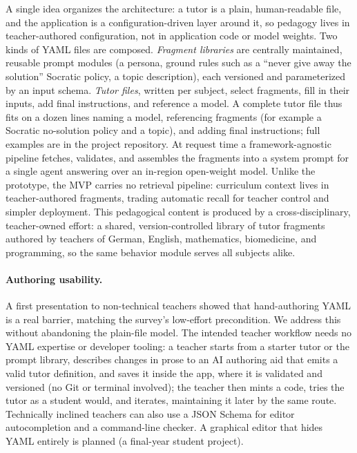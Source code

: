 \documentclass[runningheads]{llncs}
\begin{document}
A single idea organizes the architecture: a tutor is a plain, human-readable file, and the application is a configuration-driven layer around it, so pedagogy lives in teacher-authored configuration, not in application code or model weights. Two kinds of YAML files are composed. \emph{Fragment libraries} are centrally maintained, reusable prompt modules (a persona, ground rules such as a ``never give away the solution'' Socratic policy, a topic description), each versioned and parameterized by an input schema. \emph{Tutor files}, written per subject, select fragments, fill in their inputs, add final instructions, and reference a model. A complete tutor file thus fits on a dozen lines naming a model, referencing fragments (for example a Socratic no-solution policy and a topic), and adding final instructions; full examples are in the project repository. At request time a framework-agnostic pipeline fetches, validates, and assembles the fragments into a system prompt for a single agent answering over an in-region open-weight model. Unlike the prototype, the MVP carries no retrieval pipeline: curriculum context lives in teacher-authored fragments, trading automatic recall for teacher control and simpler deployment. This pedagogical content is produced by a cross-disciplinary, teacher-owned effort: a shared, version-controlled library of tutor fragments authored by teachers of German, English, mathematics, biomedicine, and programming, so the same behavior module serves all subjects alike.

\paragraph{Authoring usability.}
A first presentation to non-technical teachers showed that hand-authoring YAML is a real barrier, matching the survey's low-effort precondition. We address this without abandoning the plain-file model. The intended teacher workflow needs no YAML expertise or developer tooling: a teacher starts from a starter tutor or the prompt library, describes changes in prose to an AI authoring aid that emits a valid tutor definition, and saves it inside the app, where it is validated and versioned (no Git or terminal involved); the teacher then mints a code, tries the tutor as a student would, and iterates, maintaining it later by the same route. Technically inclined teachers can also use a JSON Schema for editor autocompletion and a command-line checker. A graphical editor that hides YAML entirely is planned (a final-year student project).
\end{document}
